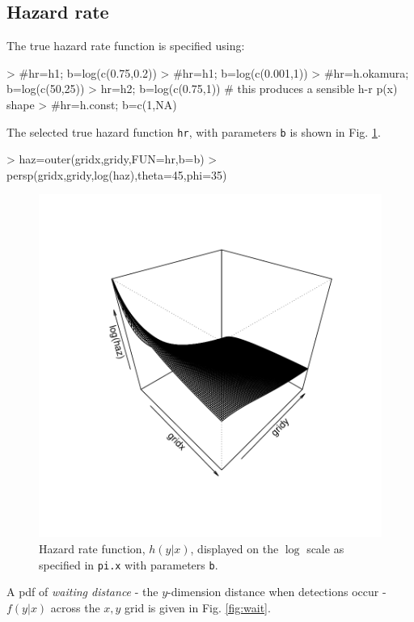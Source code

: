 \documentclass{article}
\begin{document}
\subsection{Hazard rate}
The true hazard rate function is specified using:
\begin{Schunk}
\begin{Sinput}
> #hr=h1; b=log(c(0.75,0.2))
> #hr=h1; b=log(c(0.001,1))
> #hr=h.okamura; b=log(c(50,25))
> hr=h2; b=log(c(0.75,1)) # this produces a sensible h-r p(x) shape
> #hr=h.const; b=c(1,NA)
\end{Sinput}
\end{Schunk}
The selected true hazard function \texttt{hr}, with parameters \texttt{b} is shown in Fig. \ref{fig:hr}.

\begin{Schunk}
\begin{Sinput}
> haz=outer(gridx,gridy,FUN=hr,b=b)
> persp(gridx,gridy,log(haz),theta=45,phi=35)
\end{Sinput}
\end{Schunk}
\begin{figure}
\begin{centering}
\includegraphics{simulations-fighr}

\caption{Hazard rate function, $h(y|x)$, displayed on the $\log$ scale as specified in \texttt{pi.x} with parameters \texttt{b}.} \label{fig:hr}
\end{centering}
\end{figure}
A pdf of \emph{waiting distance} - the $y$-dimension distance when detections occur - $f(y|x)$ across the $x,y$ grid is given in Fig. \ref{fig:wait}.
\end{document}

